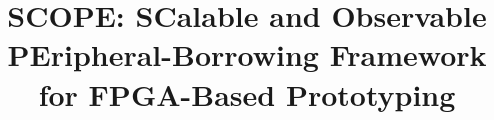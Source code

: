 \documentclass[10pt,conference,letterpaper]{IEEEtran}
\begin{document}
%
\title{SCOPE: SCalable and Observable PEripheral-Borrowing Framework for FPGA-Based Prototyping}




% 
\end{document}
